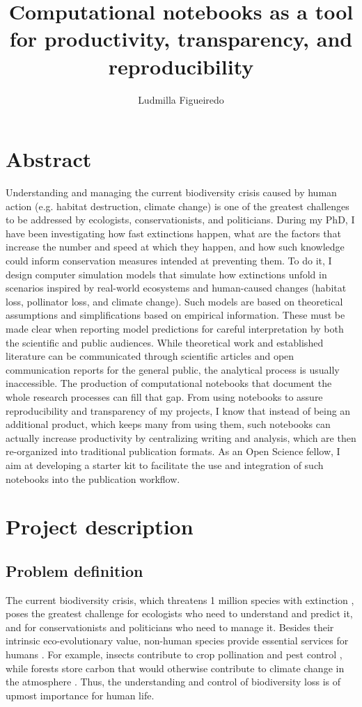 \documentclass[11pt,]{article}
\title{Computational notebooks as a tool for productivity, transparency, and reproducibility}
\author[1,2]{Ludmilla Figueiredo}
\affil[1]{Department of Animal Ecology and Tropical Biology, Faculty of Biology, University of Wuerzburg, 97074 Wuerzburg, Germany}
\affil[2]{Center for Computational and Theoretical Ecology, Faculty of Biology, University of Wuerzburg, 97074 Wuerzburg, Germany}
\begin{document}
\maketitle

\section*{Abstract}
Understanding and managing the current biodiversity crisis caused by human action (e.g. habitat destruction, climate change) is one of the greatest challenges to be addressed by ecologists, conservationists, and politicians.
During my PhD, I have been investigating how fast extinctions happen, what are the factors that increase the number and speed at which they happen, and how such knowledge could inform conservation measures intended at preventing them.
To do it, I design computer simulation models that simulate how extinctions unfold in scenarios inspired by real-world ecosystems and human-caused changes (habitat loss, pollinator loss, and climate change).
Such models are based on theoretical assumptions and simplifications based on empirical information.
These must be made clear when reporting model predictions for careful interpretation by both the scientific and public audiences.
While theoretical work and established literature can be communicated through scientific articles and open communication reports for the general public, the analytical process is usually inaccessible.
The production of computational notebooks that document the whole research processes can fill that gap.
From using notebooks to assure reproducibility and transparency of my projects, I know that instead of being an additional product, which keeps many from using them, such notebooks can actually increase productivity by centralizing writing and analysis, which are then re-organized into traditional publication formats.
As an Open Science fellow, I aim at developing a starter kit to facilitate the use and integration of such notebooks into the publication workflow.

\section*{Project description}
\subsection*{Problem definition}
The current biodiversity crisis, which threatens 1 million species with extinction \cite{ipbes_chapter_2019}, poses the greatest challenge for ecologists who need to understand and predict it, and for conservationists and politicians who need to manage it.
Besides their intrinsic eco-evolutionary value, non-human species provide essential services for humans \cite{ipbes_chapter_2019}.
For example, insects contribute to crop pollination \cite{bartomeus_need_2019} and pest control \cite{martin_pest_2015}, while forests store carbon that would otherwise contribute to climate change in the atmosphere \cite{sullivan_longterm_2020}.
Thus, the understanding and control of biodiversity loss is of upmost importance for human life.
\end{document}
